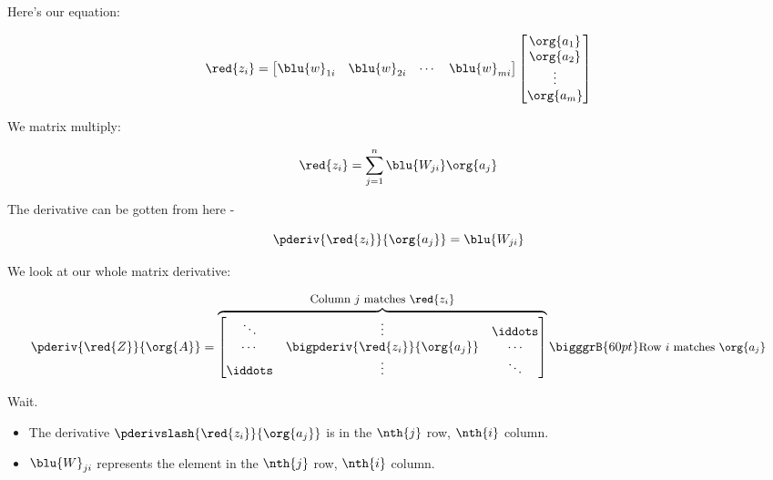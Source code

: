         Here's our equation:
        
        \begin{equation}
            \red{z_i} 
            =
            \begin{bmatrix}
                \blu{w}_{1i} & \blu{w}_{2i} & \cdots & \blu{w}_{mi}
            \end{bmatrix}
            \begin{bmatrix}
                \org{a_1}\\\org{a_2}\\ \vdots \\ \org{a_m}
            \end{bmatrix}
        \end{equation}
        
        We matrix multiply:
        
        \begin{equation}
            \red{z_i} 
            =
            \sum_{j=1}^n
            \blu{W_{ji} }\org{a_j}
        \end{equation}
        
        The derivative can be gotten from here -
        
        \begin{equation}
            \pderiv{ \red{z_i} }{ \org{a_j}  } =  \blu{W_{ji}}
        \end{equation}
        
        We look at our whole matrix derivative:

        
        \begin{equation}
            \pderiv{ \red{Z} }{ \org{A} } 
            =
            \overbrace{
                \begin{bmatrix}
                    \ddots &  \vdots                               & \iddots \\
                    \cdots & \bigpderiv{ \red{z_i} }{ \org{a_j}  } & \cdots \\
                    \iddots& \vdots                                & \ddots
                \end{bmatrix}
                }^{ \text{\small Column $j$ matches $\red{z_i}$} }
            \bigggrB{60pt} \text{\small Row $i$ matches $\org{a_j}$} 
        \end{equation}
        
        Wait. 
        \begin{itemize}
            \item The derivative $\pderivslash{ \red{z_i} }{ \org{a_j}  }$ is in the $\nth{j}$ row, $\nth{i}$ column.
            
            \item $\blu{W}_{ji}$ represents the element in the $\nth{j}$ row, $\nth{i}$ column.
        \end{itemize}
        
